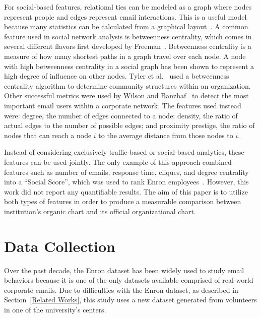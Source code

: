 \documentclass[10pt,twocolumn,conference]{IEEEtran}
\begin{document}
For social-based features, relational ties can be modeled as a graph where nodes represent people and edges represent email interactions.
This is a useful model because many statistics can be calculated from a graphical layout~\cite{wasserman_social_1994}.
A common feature used in social network analysis is betweenness centrality, which comes in several different flavors first developed by Freeman~\cite{freeman_set_1977}.
Betweenness centrality is a measure of how many shortest paths in a graph travel over each node.
A node with high betweenness centrality in a social graph has been shown to represent a high degree of influence on other nodes.
Tyler et al.~\cite{tyler_email_2003} used a betweenness centrality algorithm to determine community structures within an organization.
Other successful metrics were used by Wilson and Banzhaf~\cite{wilson_discovery_2009} to detect the most important email users within a corporate network.
The features used instead were: degree, the number of edges connected to a node; density, the ratio of actual edges to the number of possible edges; and proximity prestige, the ratio of nodes that can reach a node $i$ to the average distance from those nodes to $i$.

Instead of considering exclusively traffic-based or social-based analytics, these features can be used jointly.
The only example of this approach combined features such as number of emails, response time, cliques, and degree centrality into a ``Social Score'', which was used to rank Enron employees~\cite{rowe_automated_2007}.  
However, this work did not report any quantifiable results.
The aim of this paper is to utilize both types of features in order to produce a measurable comparison between institution's organic chart and its official organizational chart.

\section{Data Collection} \label{Data Collection}

Over the past decade, the Enron dataset has been widely used to study email behaviors because it is one of the only datasets available comprised of real-world corporate emails.
Due to difficulties with the Enron dataset, as described in Section~\ref{Related Works}, this study uses a new dataset generated from volunteers in one of the university's centers.
\end{document}
